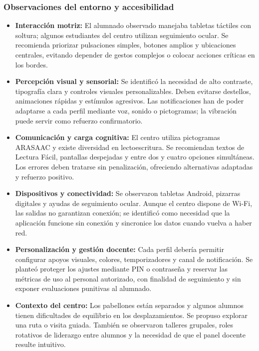 \subsubsection{Observaciones del entorno y accesibilidad}
\begin{itemize}[leftmargin=*]
  \item \textbf{Interacción motriz:} El alumnado observado manejaba tabletas táctiles con soltura; algunos estudiantes del centro utilizan seguimiento ocular. Se recomienda priorizar pulsaciones simples, botones amplios y ubicaciones centrales, evitando depender de gestos complejos o colocar acciones críticas en los bordes.
  \item \textbf{Percepción visual y sensorial:} Se identificó la necesidad de alto contraste, tipografía clara y controles visuales personalizables. Deben evitarse destellos, animaciones rápidas y estímulos agresivos. Las notificaciones han de poder adaptarse a cada perfil mediante voz, sonido o pictogramas; la vibración puede servir como refuerzo confirmatorio.
  \item \textbf{Comunicación y carga cognitiva:} El centro utiliza pictogramas ARASAAC y existe diversidad en lectoescritura. Se recomiendan textos de Lectura Fácil, pantallas despejadas y entre dos y cuatro opciones simultáneas. Los errores deben tratarse sin penalización, ofreciendo alternativas adaptadas y refuerzo positivo.
  \item \textbf{Dispositivos y conectividad:} Se observaron tabletas Android, pizarras digitales y ayudas de seguimiento ocular. Aunque el centro dispone de Wi-Fi, las salidas no garantizan conexión; se identificó como necesidad que la aplicación funcione sin conexión y sincronice los datos cuando vuelva a haber red.
  \item \textbf{Personalización y gestión docente:} Cada perfil debería permitir configurar apoyos visuales, colores, temporizadores y canal de notificación. Se planteó proteger los ajustes mediante PIN o contraseña y reservar las métricas de uso al personal autorizado, con finalidad de seguimiento y sin exponer evaluaciones punitivas al alumnado.
  \item \textbf{Contexto del centro:} Los pabellones están separados y algunos alumnos tienen dificultades de equilibrio en los desplazamientos. Se propuso explorar una ruta o visita guiada. También se observaron talleres grupales, roles rotativos de liderazgo entre alumnos y la necesidad de que el panel docente resulte intuitivo.
\end{itemize}

